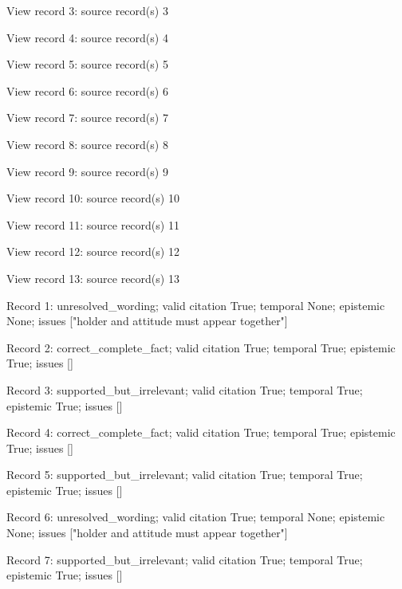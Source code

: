 View record 3: source record(s) 3\par

View record 4: source record(s) 4\par

View record 5: source record(s) 5\par

View record 6: source record(s) 6\par

View record 7: source record(s) 7\par

View record 8: source record(s) 8\par

View record 9: source record(s) 9\par

View record 10: source record(s) 10\par

View record 11: source record(s) 11\par

View record 12: source record(s) 12\par

View record 13: source record(s) 13\par

Record 1: unresolved\_wording; valid citation True; temporal None; epistemic None; issues ["holder and attitude must appear together"]\par

Record 2: correct\_complete\_fact; valid citation True; temporal True; epistemic True; issues []\par

Record 3: supported\_but\_irrelevant; valid citation True; temporal True; epistemic True; issues []\par

Record 4: correct\_complete\_fact; valid citation True; temporal True; epistemic True; issues []\par

Record 5: supported\_but\_irrelevant; valid citation True; temporal True; epistemic True; issues []\par

Record 6: unresolved\_wording; valid citation True; temporal None; epistemic None; issues ["holder and attitude must appear together"]\par

Record 7: supported\_but\_irrelevant; valid citation True; temporal True; epistemic True; issues []\par

